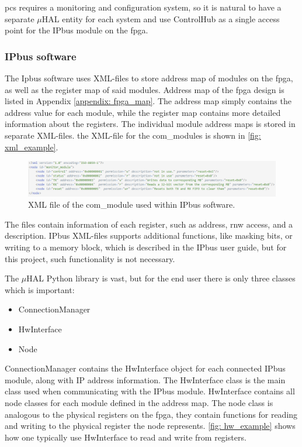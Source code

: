 \documentclass[main.tex]{subfiles}
\begin{document}
\gls{pcs} requires a monitoring and configuration system, so it is natural to have a separate $\mu$HAL entity for each system and use ControlHub as a single access point for the IPbus module on the \gls{fpga}.

\subsubsection{IPbus software}


The Ipbus software uses XML-files to store address map of modules on the \gls{fpga}, as well as the register map of said modules. Address map of the \gls{fpga} design is listed in Appendix \ref{appendix: fpga_map}. The address map simply contains the address value for each module, while the register map contains more detailed information about the registers. The individual module address maps is stored in separate XML-files. the XML-file for the com\_modules is shown in \autoref{fig: xml_example}.

\begin{figure}[!htpb]
    \centering
    \includegraphics[scale=0.65, width = 15cm]{images/com_module_xml.png}
    \caption{XML file of the com\_module used within IPbus software.}
    \label{fig: xml_example}
\end{figure}
\FloatBarrier

The files contain information of each register, such as address, \gls{rnw} access, and a description. IPbus XML-files supports additional functions, like masking bits, or writing to a memory block,  which is described in the IPbus user guide\cite{ipbus_guide}, but for this project, such functionality is not necessary.

The $\mu$HAL Python library is vast, but for the end user there is only three classes which is important:

\begin{itemize}
    \item ConnectionManager
    \item HwInterface
    \item Node
\end{itemize}

ConnectionManager contains the HwInterface object for each connected IPbus module, along with IP address information. The HwInterface class is the main class used when communicating with the IPbus module. HwInterface contains all node classes for each module defined in the address map. The node class is analogous to the physical registers on the \gls{fpga}, they contain functions for reading and writing to the physical register the node represents. \autoref{fig: hw_example} shows how one typically use HwInterface to read and write from registers.
\end{document}
